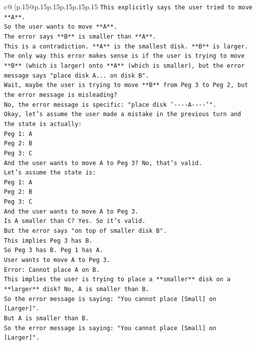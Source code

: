 \documentclass{article}
\begin{document}
{\begin{supertabular}{c@{$\;$}|p{.15\linewidth}@{}p{.15\linewidth}p{.15\linewidth}p{.15\linewidth}p{.15\linewidth}p{.15\linewidth}}
{{{\texttt{This explicitly says the user tried to move **A**.} \\
\texttt{So the user wants to move **A**.} \\
\texttt{The error says **B** is smaller than **A**.} \\
\texttt{This is a contradiction. **A** is the smallest disk. **B** is larger.} \\
\texttt{The only way this error makes sense is if the user is trying to move **B** (which is larger) onto **A** (which is smaller), but the error message says "place disk A... on disk B".} \\
\texttt{Wait, maybe the user is trying to move **B** from Peg 3 to Peg 2, but the error message is misleading?} \\
\texttt{No, the error message is specific: "place disk '{-}{-}{-}{-}A{-}{-}{-}{-}'".} \\
\texttt{Okay, let's assume the user made a mistake in the previous turn and the state is actually:} \\
\texttt{Peg 1: A} \\
\texttt{Peg 2: B} \\
\texttt{Peg 3: C} \\
\texttt{And the user wants to move A to Peg 3? No, that's valid.} \\
\texttt{Let's assume the state is:} \\
\texttt{Peg 1: A} \\
\texttt{Peg 2: B} \\
\texttt{Peg 3: C} \\
\texttt{And the user wants to move A to Peg 3.} \\
\texttt{Is A smaller than C? Yes. So it's valid.} \\
\texttt{But the error says "on top of smaller disk B".} \\
\texttt{This implies Peg 3 has B.} \\
\texttt{So Peg 3 has B. Peg 1 has A.} \\
\texttt{User wants to move A to Peg 3.} \\
\texttt{Error: Cannot place A on B.} \\
\texttt{This implies the user is trying to place a **smaller** disk on a **larger** disk? No, A is smaller than B.} \\
\texttt{So the error message is saying: "You cannot place {[}Small{]} on {[}Larger{]}".} \\
\texttt{But A is smaller than B.} \\
\texttt{So the error message is saying: "You cannot place {[}Small{]} on {[}Larger{]}".} \\
}}}
\end{supertabular}}
\end{document}
